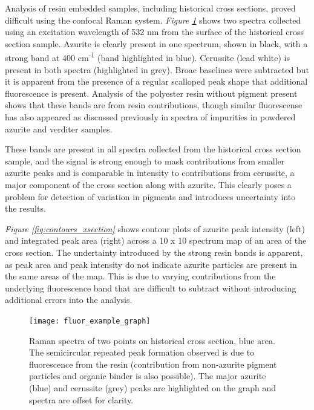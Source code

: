 Analysis of resin embedded samples, including historical cross sections, proved difficult using the confocal Raman system. \textit{Figure \ref{fig:fluor_example_graph}} shows two spectra collected using an excitation wavelength of 532 nm from the surface of the historical cross section sample. Azurite is clearly present in one spectrum, shown in black, with a strong band at 400 cm\textsuperscript{-1} (band highlighted in blue). Cerussite (lead white) is present in both spectra (highlighted in grey). Broac baselines were subtracted but it is apparent from the presence of a regular scalloped peak shape that additional fluorescence is present. Analysis of the polyester resin without pigment present shows that these bands are from resin contributions, though similar fluorescense has also appeared as discussed previously in spectra of impurities in powdered azurite and verditer samples. 

These bands are present in all spectra collected from the historical cross section sample, and the signal is strong enough to mask contributions from smaller azurite peaks and is comparable in intensity to contributions from cerussite, a major component of the cross section along with azurite. This clearly poses a problem for detection of variation in pigments and introduces uncertainty into the results.

\textit{Figure \ref{fig:contours_xsection}} shows contour plots of azurite peak intensity (left) and integrated peak area (right) across a 10 x 10 spectrum map of an area of the cross section. The undertainty introduced by the strong resin bands is apparent, as peak area and peak intensity do not indicate azurite particles are present in the same areas of the map. This is due to varying contributions from the underlying fluorescence band that are difficult to subtract without introducing additional errors into the analysis.

\begin{figure}[H]
\centering
  \texttt{[image: fluor\_example\_graph]}
\caption[Raman spectra of historical cross section]{Raman spectra of two points on historical cross section, blue area. The semicircular repeated peak formation observed is due to fluorescence from the resin (contribution from non-azurite pigment particles and organic binder is also possible). The major azurite (blue) and cerussite (grey) peaks are highlighted on the graph and spectra are offset for clarity.}
\label{fig:fluor_example_graph}
\end{figure}


